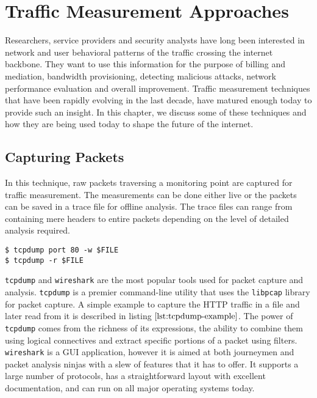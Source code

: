 \chapter{Traffic Measurement Approaches}\label{ch:traffic-measurement-approaches}

Researchers, service providers and security analysts have long been interested in network and user behavioral patterns of the traffic crossing the internet backbone. They want to use this information for the purpose of billing and mediation, bandwidth provisioning, detecting malicious attacks, network performance evaluation and overall improvement. Traffic measurement techniques that have been rapidly evolving in the last decade, have matured enough today to provide such an insight. In this chapter, we discuss some of these techniques and how they are being used today to shape the future of the internet.

\section{Capturing Packets}\label{sec:capturing-packets}
In this technique, raw packets traversing a monitoring point are captured for traffic measurement. The measurements can be done either live or the packets can be saved in a trace file for offline analysis. The trace files can range from containing mere headers to entire packets depending on the level of detailed analysis required. 

\begin{lstlisting}
$ tcpdump port 80 -w $FILE
$ tcpdump -r $FILE
\end{lstlisting}

\texttt{tcpdump} and \texttt{wireshark} are the most popular tools used for packet capture and analysis. \texttt{tcpdump} \cite{tcpdump-manpage} is a premier command-line utility that uses the \texttt{libpcap} \cite{pcap-manpage} library for packet capture. A simple example to capture  the \ac{HTTP} traffic in a file and later read from it is described in listing $\ref{lst:tcpdump-example}$. The power of \texttt{tcpdump}  comes from the richness of its expressions, the ability to combine them using logical connectives and extract specific portions of a packet using filters. \texttt{wireshark} \cite{wireshark-manpage} is a \ac{GUI} application, however it is aimed at both journeymen and packet analysis  ninjas with a slew of features that it has to offer. It supports a large number of protocols, has a straightforward layout with excellent documentation, and can run on all major operating systems today. 

